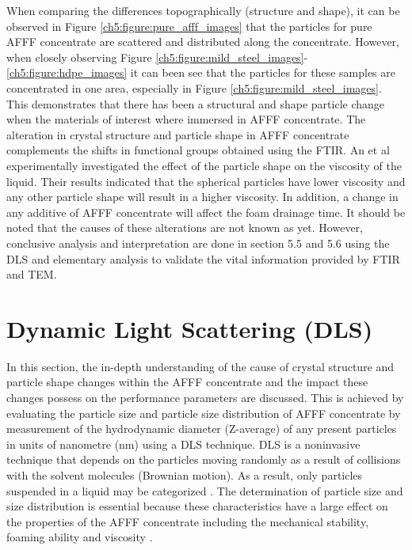 When comparing the differences topographically (structure and shape), it can be observed in Figure \ref{ch5:figure:pure_afff_images} that the particles for pure AFFF concentrate are scattered and distributed along the concentrate. However, when closely observing Figure \ref{ch5:figure:mild_steel_images}-\ref{ch5:figure:hdpe_images} it can been see that the particles for these samples are concentrated in one area, especially in Figure \ref{ch5:figure:mild_steel_images}. This demonstrates that there has been a structural and shape particle change when the materials of interest where immersed in AFFF concentrate. The alteration in crystal structure and particle shape in AFFF concentrate complements the shifts in functional groups obtained using the FTIR. An et al \cite{lin1991handbook} experimentally investigated the effect of the particle shape on the viscosity of the liquid. Their results indicated that the spherical particles have lower viscosity and any other particle shape will result in a higher viscosity. In addition, a change in any additive of AFFF concentrate will affect the foam drainage time. It should be noted that the causes of these alterations are not known as yet. However, conclusive analysis and interpretation are done in section 5.5 and 5.6 using the DLS and elementary analysis to validate the vital information provided by FTIR and TEM.

\section{Dynamic Light Scattering (DLS)}
In this section, the in-depth understanding of the cause of crystal structure and particle shape changes within the AFFF concentrate and the impact these changes possess on the performance parameters are discussed. This is achieved by evaluating the particle size and particle size distribution of AFFF concentrate by measurement of the hydrodynamic diameter (Z-average) of any present particles in units of nanometre (nm) using a DLS technique. DLS is a noninvasive technique that depends on the particles moving randomly as a result of collisions with the solvent molecules (Brownian motion). As a result, only particles suspended in a liquid may be categorized \cite{mudunkotuwa2014atr}. The determination of particle size and size distribution is essential because these characteristics have a large effect on the properties of the AFFF concentrate including the mechanical stability, foaming ability and viscosity \cite{mohamed2017fourier}.

